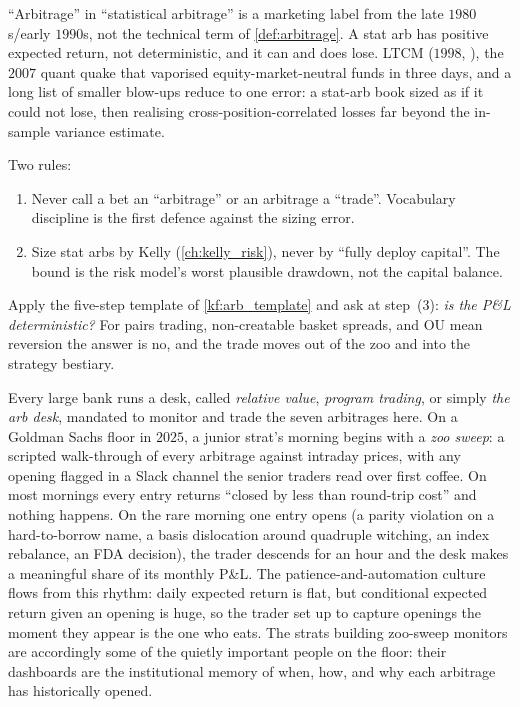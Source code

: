 \begin{pitfallbox}
\label{pf:stat_arb_is_not}
``Arbitrage'' in ``statistical arbitrage'' is a marketing
label from the late $1980$s/early $1990$s, not the technical
term of \cref{def:arbitrage}. A stat arb has positive expected
return, not deterministic, and it can and does lose. LTCM
($1998$, \citep{lowenstein2000ltcm}), the $2007$ quant quake
that vaporised equity-market-neutral funds in three days, and a
long list of smaller blow-ups reduce to one error: a stat-arb
book sized as if it could not lose, then realising
cross-position-correlated losses far beyond the in-sample
variance estimate.

Two rules:
\begin{enumerate}
  \item Never call a bet an ``arbitrage'' or an arbitrage a
  ``trade''. Vocabulary discipline is the first defence against
  the sizing error.
  \item Size stat arbs by Kelly (\cref{ch:kelly_risk}), never by
  ``fully deploy capital''. The bound is the risk model's worst
  plausible drawdown, not the capital balance.
\end{enumerate}
Apply the five-step template of \cref{kf:arb_template} and ask
at step~(3): \emph{is the P\&L deterministic?} For pairs
trading, non-creatable basket spreads, and OU mean reversion
the answer is no, and the trade moves out of the zoo and into
the strategy bestiary.
\end{pitfallbox}

\begin{gsbox}
Every large bank runs a desk, called \emph{relative value},
\emph{program trading}, or simply \emph{the arb desk}, mandated
to monitor and trade the seven arbitrages here. On a Goldman Sachs
floor in $2025$, a junior strat's morning begins with a
\emph{zoo sweep}: a scripted walk-through of every arbitrage
against intraday prices, with any opening flagged in a Slack
channel the senior traders read over first coffee. On most
mornings every entry returns ``closed by less than round-trip
cost'' and nothing happens. On the rare morning one entry
opens (a parity violation on a hard-to-borrow name, a basis
dislocation around quadruple witching, an index rebalance, an
FDA decision), the trader descends for an hour and the desk
makes a meaningful share of its monthly P\&L. The
patience-and-automation culture flows from this rhythm: daily
expected return is flat, but conditional expected return given
an opening is huge, so the trader set up to capture openings
the moment they appear is the one who eats. The strats
building zoo-sweep monitors are accordingly some of the
quietly important people on the floor: their dashboards are
the institutional memory of when, how, and why each arbitrage
has historically opened.
\end{gsbox}

